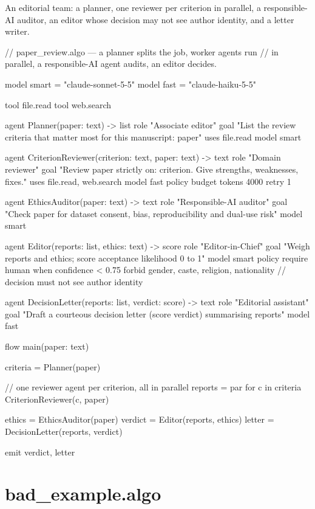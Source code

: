 An editorial team: a planner, one reviewer per criterion in parallel, a responsible-AI auditor, an editor whose decision may not see author identity, and a letter writer.

\begin{algo}[title=paper\_review.algo]
// paper_review.algo — a planner splits the job, worker agents run
// in parallel, a responsible-AI agent audits, an editor decides.

model smart = "claude-sonnet-5-5"
model fast  = "claude-haiku-5-5"

tool file.read
tool web.search

agent Planner(paper: text) -> list {
    role  "Associate editor"
    goal  "List the review criteria that matter most for this manuscript: {paper}"
    uses  file.read
    model smart
}

agent CriterionReviewer(criterion: text, paper: text) -> text {
    role  "Domain reviewer"
    goal  "Review {paper} strictly on: {criterion}. Give strengths, weaknesses, fixes."
    uses  file.read, web.search
    model fast
    policy {
        budget tokens 4000
        retry 1
    }
}

agent EthicsAuditor(paper: text) -> text {
    role  "Responsible-AI auditor"
    goal  "Check {paper} for dataset consent, bias, reproducibility and dual-use risk"
    model smart
}

agent Editor(reports: list, ethics: text) -> score {
    role  "Editor-in-Chief"
    goal  "Weigh {reports} and {ethics}; score acceptance likelihood 0 to 1"
    model smart
    policy {
        require human when confidence < 0.75
        forbid gender, caste, religion, nationality   // decision must not see author identity
    }
}

agent DecisionLetter(reports: list, verdict: score) -> text {
    role  "Editorial assistant"
    goal  "Draft a courteous decision letter (score {verdict}) summarising {reports}"
    model fast
}

flow main(paper: text) {
    criteria = Planner(paper)

    // one reviewer agent per criterion, all in parallel
    reports = par for c in criteria { CriterionReviewer(c, paper) }

    ethics  = EthicsAuditor(paper)
    verdict = Editor(reports, ethics)
    letter  = DecisionLetter(reports, verdict)

    emit verdict, letter
}
\end{algo}

\section{bad\_example.algo}

